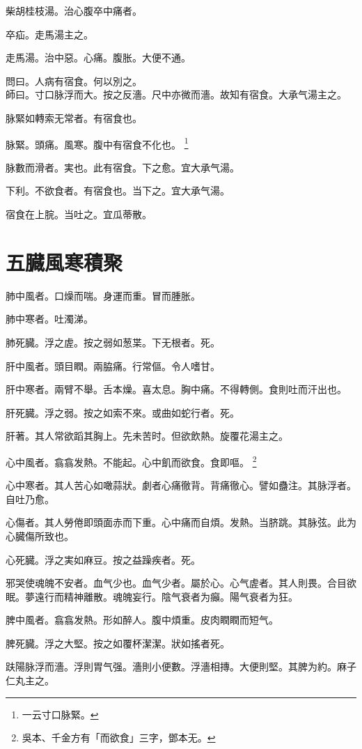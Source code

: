 柴胡桂枝湯。治心腹卒中痛者。{\dengben}

卒疝。走馬湯主之。{\wuben}

走馬湯。治中惡。心痛。腹胀。大便不通。{\dengben}

問曰。人病有宿食。何以別之。\\
師曰。寸口脉浮而大。按之反濇。尺中亦微而濇。故知有宿食。大承气湯主之。

脉緊如轉索无常者。有宿食也。

脉緊。頭痛。風寒。腹中有宿食不化也。
\footnote{一云寸口脉緊。}

脉數而滑者。実也。此有宿食。下之愈。宜大承气湯。

下利。不欲食者。有宿食也。当下之。宜大承气湯。

宿食在上脘。当吐之。宜瓜蒂散。

\chapter{五臓風寒積聚}

肺中風者。口燥而喘。身運而重。冒而腫胀。

肺中寒者。吐濁涕。

肺死臓。浮之虗。按之弱如葱枼。下无根者。死。

肝中風者。頭目瞤。兩脇痛。行常傴。令人嗜甘。

肝中寒者。兩臂不舉。舌本燥。喜太息。胸中痛。不得轉側。食則吐而汗出也。

肝死臓。浮之弱。按之如索不來。或曲如蛇行者。死。

肝著。其人常欲蹈其胸上。先未苦时。但欲飲熱。旋覆花湯主之。

心中風者。翕翕发熱。不能起。心中飢{\khaaitp 而欲食}。食即嘔。
	\footnote{
		吳本、千金方有「而欲食」三字，鄧本无。
	}

心中寒者。其人苦心如噉蒜狀。劇者心痛徹背。背痛徹心。譬如蠱注。其脉浮者。自吐乃愈。

心傷者。其人勞倦即頭面赤而下重。心中痛而自煩。发熱。当脐跳。其脉弦。此为心臓傷所致也。

心死臓。浮之実如麻豆。按之益躁疾者。死。

邪哭使魂魄不安者。血气少也。血气少者。屬於心。心气虗者。其人則畏。合目欲眠。夢遠行而精神離散。魂魄妄行。陰气衰者为癲。陽气衰者为狂。

脾中風者。翕翕发熱。形如醉人。腹中煩重。皮肉瞤瞤而短气。

脾死臓。浮之大堅。按之如覆杯潔潔。狀如搖者死。

趺陽脉浮而濇。浮則胃气强。濇則小便數。浮濇相摶。大便則堅。其脾为約。麻子仁丸主之。

